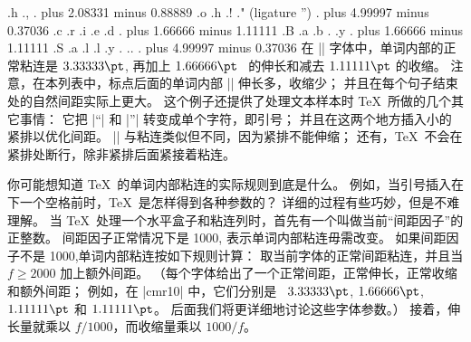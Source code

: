 .\tenrm h
.\tenrm ,
. plus 2.08331 minus 0.88889
.\tenrm o
.\tenrm h
.\tenrm !
.\tenrm " (ligature '')
. plus 4.99997 minus 0.37036
.\tenrm c
.\tenrm r
.\tenrm i
.\tenrm e
.\tenrm d
. plus 1.66666 minus 1.11111
.\tenrm B
.\tenrm a
.\tenrm b
.
.\tenrm y
\endtt
\begintt
. plus 1.66666 minus 1.11111
.\tenrm S
.\tenrm a
.\tenrm l
.\tenrm l
.\tenrm y
.
.\tenrm .
. plus 4.99997 minus 0.37036
\endtt
在 |\tenrm| 字体中，单词内部的正常粘连是 $3.33333\pt$, 再加上 $1.66666\pt$~%
的伸长和减去 $1.11111\pt$ 的收\hbox{缩。}%
注意，在本列表中，标点后面的单词内部 |\glue| 伸长多，收缩少；
并且在每个句子结束处的自然间距实际上更大。%
这个例子还提供了处理文本样本时 \TeX\ 所做的几个其它事情：
它把 |``| 和 |''| 转变成单个字符，即引号；
并且在这两个地方插入小的紧排以优化间距。%
|\kern| 与粘连类似但不同，因为紧排不能伸缩；
还有，\TeX\ 不会在紧排处断行，除非紧排后面紧接着粘连。

\ddanger 你可能想知道 \TeX\ 的单词内部粘连的实际规则到底是什么。
例如，当引号插入在下一个空格前时，\TeX\ 是怎样得到各种参数的？
详细的过程有些巧妙，但是不难理解。
\1当 \TeX\ 处理一个水平盒子和粘连列时，首先有一个叫做当前``间距因子''的正整数。
间距因子正常情况下是 1000, 表示单词内部粘连毋需改变。
如果间距因子不是 1000,单词内部粘连按如下规则计算：
取当前字体的正常间距粘连，并且当 $f\ge 2000$ 加上额外间距。%
（每个字体给出了一个正常间距，正常伸长，正常收缩和额外间距；
例如，在 |cmr10| 中，它们分别是
~$3.33333\pt$, $1.66666\pt$, $1.11111\pt$ 和  $1.11111\pt$。
后面我们将更详细地讨论这些字体参数。）
接着，伸长量就乘以 $f/1000$，而收缩量乘以 $1000/f$。

